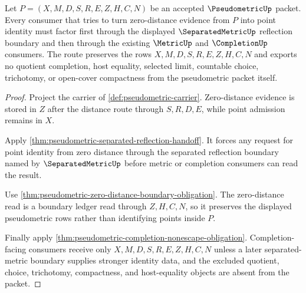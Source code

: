 \begin{theorem}
\label{thm:pseudometric-quotient-reflection-route}
Let $P=(X,M,D,S,R,E,Z,H,C,N)$ be an accepted $\PseudometricUp$ packet. Every consumer that tries to turn zero-distance evidence from $P$ into point identity must factor first through the displayed $\SeparatedMetricUp$ reflection boundary and then through the existing $\MetricUp$ and $\CompletionUp$ consumers. The route preserves the rows $X,M,D,S,R,E,Z,H,C,N$ and exports no quotient completion, host equality, selected limit, countable choice, trichotomy, or open-cover compactness from the pseudometric packet itself.
\end{theorem}
\begin{proof}
Project the carrier of \autoref{def:pseudometric-carrier}. Zero-distance evidence is stored in $Z$ after the distance route through $S,R,D,E$, while point admission remains in $X$.

Apply \autoref{thm:pseudometric-separated-reflection-handoff}. It forces any request for point identity from zero distance through the separated reflection boundary named by $\SeparatedMetricUp$ before metric or completion consumers can read the result.

Use \autoref{thm:pseudometric-zero-distance-boundary-obligation}. The zero-distance read is a boundary ledger read through $Z,H,C,N$, so it preserves the displayed pseudometric rows rather than identifying points inside $P$.

Finally apply \autoref{thm:pseudometric-completion-nonescape-obligation}. Completion-facing consumers receive only $X,M,D,S,R,E,Z,H,C,N$ unless a later separated-metric boundary supplies stronger identity data, and the excluded quotient, choice, trichotomy, compactness, and host-equality objects are absent from the packet.
\end{proof}

